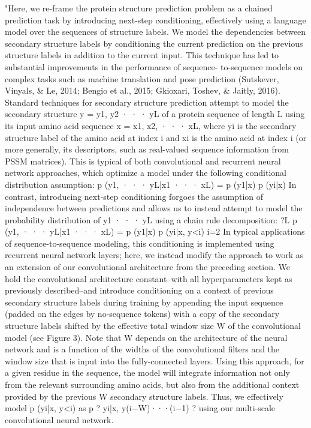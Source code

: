 \documentclass[]{scrartcl}
\begin{document}
"Here, we re-frame the protein structure prediction problem as a chained prediction task by introducing next-step conditioning, effectively using a language model over the sequences of structure labels. We model the dependencies between secondary structure labels by conditioning the current prediction on the previous structure labels in addition to the current input. This technique has led to substantial improvements in the performance of sequence- to-sequence models on complex tasks such as machine translation and pose prediction (Sutskever, Vinyals, \& Le, 2014; Bengio et al., 2015; Gkioxari, Toshev, \& Jaitly, 2016). Standard techniques for secondary structure prediction attempt to model the secondary structure y = y1, y2 · · · yL of a protein sequence of length L using its input amino acid sequence x = x1, x2, · · · xL, where yi is the secondary structure label of the amino acid at index i and xi is the amino acid at index i (or more generally, its descriptors, such as real-valued sequence information from PSSM matrices). This is typical of both convolutional and recurrent neural network approaches, which optimize a model under the following conditional distribution assumption: p (y1, · · · yL|x1 · · · xL) = p (y1|x) p (yi|x) In contrast, introducing next-step conditioning forgoes the assumption of independence between predictions and allows us to instead attempt to model the probability distribution of y1 · · · yL using a chain rule decomposition:
?L p (y1, · · · yL|x1 · · · xL) = p (y1|x) p (yi|x, y<i)
i=2
In typical applications of sequence-to-sequence modeling, this conditioning is implemented using recurrent neural network layers; here, we instead modify the approach to work as an extension of our convolutional architecture from the preceding section. We hold the convolutional architecture constant–with all hyperparameters kept as previously described–and introduce conditioning on a context of previous secondary structure labels during training by appending the input sequence (padded on the edges by no-sequence tokens) with a copy of the secondary structure labels shifted by the effective total window size W of the convolutional model (see Figure 3). Note that W depends on the architecture of the neural network and is a function of the widths of the convolutional filters and the window size that is input into the fully-connected layers. Using this approach, for a given residue in the sequence, the model will integrate information not only from the relevant surrounding amino acids, but also from the additional context provided by the previous W secondary structure labels. Thus, we effectively model p (yi|x, y<i) as p ? yi|x, y(i−W)···(i−1) ? using our multi-scale convolutional neural network.
\end{document}
